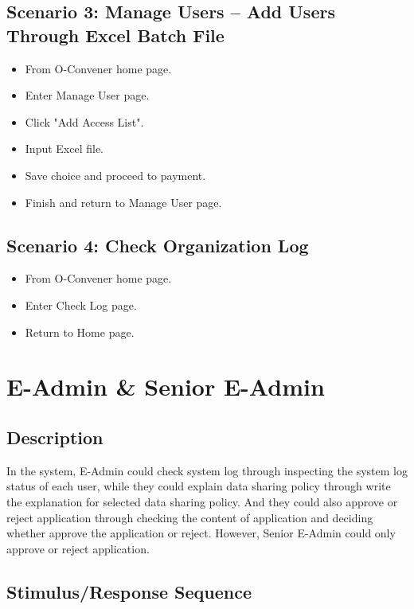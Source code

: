 \subsection*{Scenario 3: Manage Users – Add Users Through Excel Batch File}
\begin{itemize}
    \item From O-Convener home page.
    \item Enter Manage User page.
    \item Click "Add Access List".
    \item Input Excel file.
    \item Save choice and proceed to payment.
    \item Finish and return to Manage User page.
\end{itemize}

\subsection*{Scenario 4: Check Organization Log}
\begin{itemize}
    \item From O-Convener home page.
    \item Enter Check Log page.
    \item Return to Home page.
\end{itemize}

\section{E-Admin \& Senior E-Admin}

\subsection{Description}
In the system, E-Admin could check system log through inspecting the system log status of each user, while they could explain data sharing policy through write the explanation for selected data sharing policy. And they could also approve or reject application through checking the content of application and deciding whether approve the application or reject. However, Senior E-Admin could only approve or reject application. 

\subsection{Stimulus/Response Sequence}


